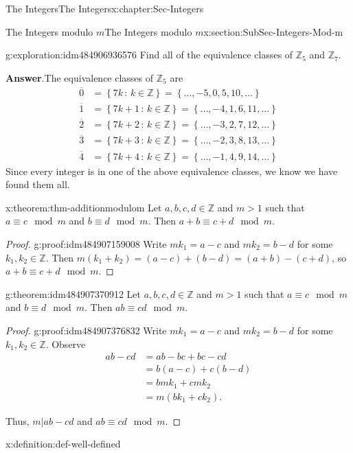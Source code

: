 \documentclass[oneside,10pt,]{book}
\newcommand{\blocktitlefont}{\relax}
\numberwithin{equation}{section}
\newcommand{\set}[1]{\left\{ {#1} \right\}}
\newcommand{\setof}[2]{{\left\{#1\,\colon\,#2\right\}}}
\def\Z{{\mathbb Z}}
\newcommand{\amp}{&}
\begin{document}
\begin{chapterptx}{The Integers}{}{The Integers}{}{}{x:chapter:Sec-Integers}
\begin{sectionptx}{The Integers modulo \(m\)}{}{The Integers modulo \(m\)}{}{}{x:section:SubSec-Integers-Mod-m}
\begin{exploration}{}{g:exploration:idm484906936576}
Find all of the equivalence classes of \(\Z_5\) and \(\Z_7\).%
\par\smallskip%
\noindent\textbf{\blocktitlefont Answer}.\hypertarget{g:answer:idm484906989680}{}\quad{}The equivalence classes of \(\Z_5\) are%
\begin{align*}
\overline{0} \amp = \setof{7k}{k\in\Z} = \set{\ldots, -5, 0, 5, 10, \ldots}\\
\overline{1} \amp = \setof{7k+1}{k\in\Z} = \set{\ldots, -4, 1, 6, 11, \ldots}\\
\overline{2} \amp = \setof{7k+2}{k\in\Z} = \set{\ldots, -3, 2, 7, 12, \ldots}\\
\overline{3} \amp = \setof{7k+3}{k\in\Z} = \set{\ldots, -2, 3, 8, 13, \ldots}\\
\overline{4} \amp = \setof{7k+4}{k\in\Z} = \set{\ldots, -1, 4, 9, 14, \ldots}
\end{align*}
Since every integer is in one of the above equivalence classes, we know we have found them all.%
\end{exploration}
\begin{theorem}{}{}{x:theorem:thm-additionmodulom}%
Let \(a,b, c,d\in \Z\) and \(m > 1\) such that \(a\equiv c\mod m\) and \(b\equiv d\mod m\). Then \(a+b \equiv c + d \mod m\).%
\end{theorem}
\begin{proof}{}{g:proof:idm484907159008}
Write \(mk_1 = a-c\) and \(m k_2 = b-d\) for some \(k_1,k_2\in \Z\). Then \(m(k_1 + k_2) = (a-c) + (b-d) = (a+b) - (c+d)\), so \(a+b \equiv c+d\mod m\).%
\end{proof}
\begin{theorem}{}{}{g:theorem:idm484907370912}%
Let \(a,b, c,d\in \Z\) and \(m > 1\) such that \(a\equiv c\mod m\) and \(b\equiv d\mod m\). Then \(ab \equiv c d\mod m\).%
\end{theorem}
\begin{proof}{}{g:proof:idm484907376832}
Write \(mk_1 = a-c\) and \(m k_2 = b-d\) for some \(k_1,k_2\in \Z\). Observe%
\begin{align*}
ab -cd \amp = ab - bc + bc - cd\\
\amp = b(a-c) + c(b-d)\\
\amp = bmk_1 + cmk_2\\
\amp = m(bk_1 + ck_2)\text{.}
\end{align*}
%
\par
Thus, \(m|ab-cd\) and \(ab \equiv cd\mod m\).%
\end{proof}
\begin{definition}{}{x:definition:def-well-defined}%

\end{definition}
\end{sectionptx}
\end{chapterptx}
\end{document}
